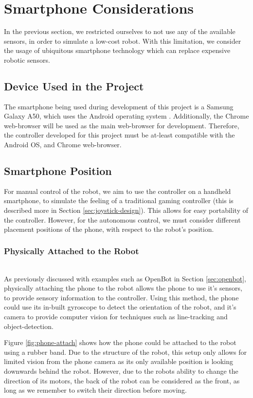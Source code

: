 \documentclass{l4proj}
\begin{document}
\section{Smartphone Considerations}
In the previous section, we restricted ourselves to not use any of the available sensors, in order to simulate a low-cost robot. With this limitation, we consider the usage of ubiquitous smartphone technology which can replace expensive robotic sensors.

\subsection{Device Used in the Project}
The smartphone being used during development of this project is a Samsung Galaxy A50, which uses the Android operating system \citep{phonespec}. Additionally, the Chrome web-browser will be used as the main web-browser for development. Therefore, the controller developed for this project must be at-least compatible with the Android OS, and Chrome web-browser.

\subsection{Smartphone Position}
For manual control of the robot, we aim to use the controller on a handheld smartphone, to simulate the feeling of a traditional gaming controller (this is described more in Section \ref{sec:joystick-design}). This allows for easy portability of the controller. However, for the autonomous control, we must consider different placement positions of the phone, with respect to the robot's position.

\subsubsection{Physically Attached to the Robot} \hfill \\
As previously discussed with examples such as OpenBot in Section \ref{sec:openbot}, physically attaching the phone to the robot allows the phone to use it's sensors, to provide sensory information to the controller. Using this method, the phone could use its in-built gyroscope to detect the orientation of the robot, and it's camera to provide computer vision for techniques such as line-tracking and object-detection. 

Figure \ref{fig:phone-attach} shows how the phone could be attached to the robot using a rubber band. Due to the structure of the robot, this setup only allows for limited vision from the phone camera as its only available position is looking downwards behind the robot. However, due to the robots ability to change the direction of its motors, the back of the robot can be considered as the front, as long as we remember to switch their direction before moving.
\end{document}
